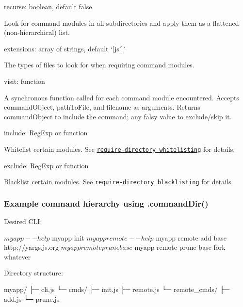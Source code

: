 \begin{DoxyItemize}
\item {\ttfamily recurse}\+: boolean, default {\ttfamily false}

Look for command modules in all subdirectories and apply them as a flattened (non-\/hierarchical) list.
\item {\ttfamily extensions}\+: array of strings, default `\mbox{[}\textquotesingle{}js'\mbox{]}\`{}

The types of files to look for when requiring command modules.
\item {\ttfamily visit}\+: function

A synchronous function called for each command module encountered. Accepts {\ttfamily command\+Object}, {\ttfamily path\+To\+File}, and {\ttfamily filename} as arguments. Returns {\ttfamily command\+Object} to include the command; any falsy value to exclude/skip it.
\item {\ttfamily include}\+: Reg\+Exp or function

Whitelist certain modules. See \href{https://www.npmjs.com/package/require-directory#whitelisting}{\tt {\ttfamily require-\/directory} whitelisting} for details.
\item {\ttfamily exclude}\+: Reg\+Exp or function

Blacklist certain modules. See \href{https://www.npmjs.com/package/require-directory#blacklisting}{\tt {\ttfamily require-\/directory} blacklisting} for details.
\end{DoxyItemize}

\subsubsection*{Example command hierarchy using {\ttfamily .command\+Dir()}}

Desired C\+LI\+:


\begin{DoxyCode}
$ myapp --help
$ myapp init
$ myapp remote --help
$ myapp remote add base http://yargs.js.org
$ myapp remote prune base
$ myapp remote prune base fork whatever
\end{DoxyCode}


Directory structure\+:


\begin{DoxyCode}
myapp/
├─ cli.js
└─ cmds/
   ├─ init.js
   ├─ remote.js
   └─ remote\_cmds/
      ├─ add.js
      └─ prune.js
\end{DoxyCode}


